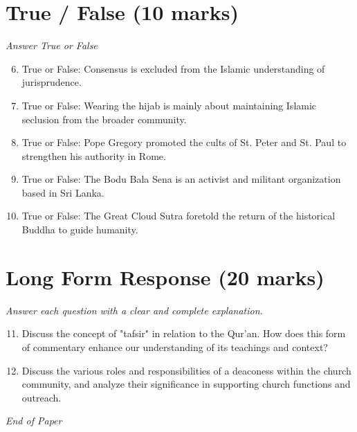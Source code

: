 \documentclass[12pt]{article}
\begin{document}
\section*{True / False (10 marks)}
\textit{Answer True or False}
\begin{enumerate}[label=\arabic*.]
\setcounter{enumi}{5}
\item True or False: Consensus is excluded from the Islamic understanding of jurisprudence.
\item True or False: Wearing the hijab is mainly about maintaining Islamic seclusion from the broader community.
\item True or False: Pope Gregory promoted the cults of St. Peter and St. Paul to strengthen his authority in Rome.
\item True or False: The Bodu Bala Sena is an activist and militant organization based in Sri Lanka.
\item True or False: The Great Cloud Sutra foretold the return of the historical Buddha to guide humanity.
\end{enumerate}

\section*{Long Form Response (20 marks)}
\textit{Answer each question with a clear and complete explanation.}
\begin{enumerate}[label=\arabic*.]
\setcounter{enumi}{10}
\item Discuss the concept of "tafsir" in relation to the Qur'an. How does this form of commentary enhance our understanding of its teachings and context?
\item Discuss the various roles and responsibilities of a deaconess within the church community, and analyze their significance in supporting church functions and outreach.
\end{enumerate}

\vfill
\noindent\textit{End of Paper}
\end{document}
